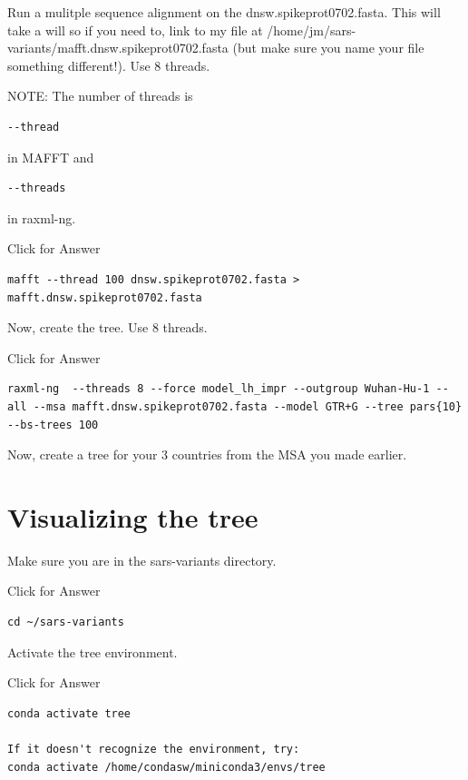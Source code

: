\documentclass[
]{book}
\begin{document}
Run a mulitple sequence alignment on the dnsw.spikeprot0702.fasta. This will take a will so if you need to, link to my file at /home/jm/sars-variants/mafft.dnsw.spikeprot0702.fasta (but make sure you name your file something different!). Use 8 threads.

NOTE: The number of threads is

\begin{verbatim}
--thread
\end{verbatim}

in MAFFT and

\begin{verbatim}
--threads
\end{verbatim}

in raxml-ng.

Click for Answer

\begin{verbatim}
mafft --thread 100 dnsw.spikeprot0702.fasta > mafft.dnsw.spikeprot0702.fasta
\end{verbatim}

\hfill\break

Now, create the tree. Use 8 threads.

Click for Answer

\begin{verbatim}
raxml-ng  --threads 8 --force model_lh_impr --outgroup Wuhan-Hu-1 --all --msa mafft.dnsw.spikeprot0702.fasta --model GTR+G --tree pars{10} --bs-trees 100
\end{verbatim}

\hfill\break

Now, create a tree for your 3 countries from the MSA you made earlier.

\hypertarget{visualizing-the-tree}{%
\section{Visualizing the tree}\label{visualizing-the-tree}}

Make sure you are in the sars-variants directory.

Click for Answer

\begin{verbatim}
cd ~/sars-variants
\end{verbatim}

\hfill\break

Activate the tree environment.

Click for Answer

\begin{verbatim}
conda activate tree

If it doesn't recognize the environment, try:
conda activate /home/condasw/miniconda3/envs/tree
\end{verbatim}
\end{document}
